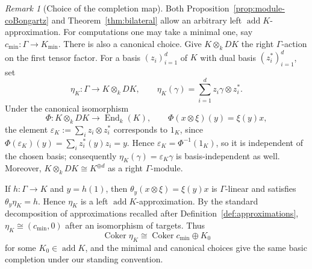 \documentclass[11pt,reqno]{amsart}
\theoremstyle{definition}
\theoremstyle{remark}
\newtheorem{remark}[theorem]{Remark}
\newcommand{\addc}{\operatorname{add}}
\newcommand{\Coker}{\operatorname{Coker}}
\numberwithin{equation}{section}
\begin{document}
\begin{remark}[Choice of the completion map]
\label{rem:completion-map}
Both Proposition~\ref{prop:module-coBongartz} and
Theorem~\ref{thm:bilateral} allow an arbitrary left
$\addc K$-approximation.  For computations one may take a minimal one,
say $c_{\min}:\Gamma\to K_{\min}$.  There is also a canonical choice.
Give $K\otimes_kDK$ the right $\Gamma$-action on the first tensor factor.
For a basis $(z_i)_{i=1}^d$ of $K$ with dual basis
$(z_i^*)_{i=1}^d$, set
\begin{equation}\label{eq:canonical-completion-map}
 \eta_K:\Gamma\longrightarrow K\otimes_kDK,
 \qquad
 \eta_K(\gamma)=\sum_{i=1}^d z_i\gamma\otimes z_i^*.
\end{equation}
Under the canonical isomorphism
\[
 \Phi:K\otimes_kDK\longrightarrow\operatorname{End}_k(K),
 \qquad
 \Phi(x\otimes\xi)(y)=\xi(y)x,
\]
the element $\varepsilon_K:=\sum_i z_i\otimes z_i^*$ corresponds to
$1_K$, since
$\Phi(\varepsilon_K)(y)=\sum_i z_i^*(y)z_i=y$.  Hence
$\varepsilon_K=\Phi^{-1}(1_K)$, so it is independent of the chosen basis;
consequently $\eta_K(\gamma)=\varepsilon_K\gamma$ is basis-independent as
well.  Moreover,
$K\otimes_kDK\cong K^{\oplus d}$ as a right $\Gamma$-module.

If $h:\Gamma\to K$ and $y=h(1)$, then
$\theta_y(x\otimes\xi)=\xi(y)x$ is $\Gamma$-linear and satisfies
$\theta_y\eta_K=h$.  Hence $\eta_K$ is a left
$\addc K$-approximation.  By the standard decomposition of approximations
recalled after Definition~\ref{def:approximations},
$\eta_K\cong(c_{\min},0)$ after an isomorphism of targets.  Thus
\[
 \Coker\eta_K\cong\Coker c_{\min}\oplus K_0
\]
for some $K_0\in\addc K$, and the minimal and canonical choices give the
same basic completion under our standing convention.
\end{remark}
\end{document}
